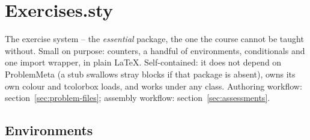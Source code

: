 \section{Exercises.sty}\label{sec:ref-exercises}

The exercise system -- the \emph{essential} package, the one the course
cannot be taught without. Small on purpose: counters, a handful of
environments, conditionals and one import wrapper, in plain LaTeX.
Self-contained: it does not depend on ProblemMeta (a stub swallows stray
 blocks if that package is absent), owns its own colour and
tcolorbox loads, and works under any class. Authoring workflow:
section~\ref{sec:problem-files}; assembly workflow:
section~\ref{sec:assessments}.

\subsection*{Environments}

